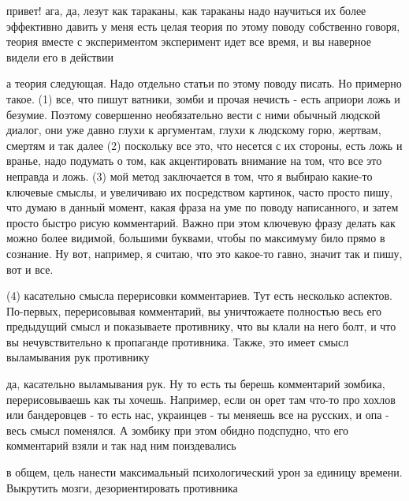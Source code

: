  
 
 
 
 


привет! ага, да, лезут как тараканы, как тараканы
надо научиться их более эффективно давить
у меня есть целая теория по этому поводу
собственно говоря, теория вместе с экспериментом
эксперимент идет все время, и вы наверное видели его в действии

а теория следующая. Надо отдельно статьи по этому поводу писать. Но примерно
такое. (1) все, что пишут ватники, зомби и прочая нечисть - есть априори ложь и
безумие. Поэтому совершенно необязательно вести с ними обычный людской диалог,
они уже давно глухи к аргументам, глухи к людскому горю, жертвам, смертям и так
далее (2) поскольку все это, что несется с их стороны, есть ложь и вранье, надо
подумать о том, как акцентировать внимание на том, что все это неправда и ложь.
(3) мой метод заключается в том, что я выбираю какие-то ключевые смыслы, и
увеличиваю их посредством картинок, часто просто пишу, что думаю в данный
момент, какая фраза на уме по поводу написанного, и затем просто быстро рисую
комментарий. Важно при этом ключевую фразу делать как можно более видимой,
большими буквами, чтобы по максимуму било прямо в сознание. Ну вот, например, я
считаю, что это какое-то гавно, значит так и пишу, вот и все.

(4) касательно смысла перерисовки комментариев. Тут есть несколько аспектов.
По-первых, перерисовывая комментарий, вы уничтожаете полностью весь его
предыдущий смысл и показываете противнику, что вы клали на него болт, и что вы
нечувствительно к пропаганде противника. Также, это имеет смысл выламывания рук
противнику

да, касательно выламывания рук. Ну то есть ты берешь комментарий зомбика,
перерисовываешь как ты хочешь. Например, если он орет там что-то про хохлов или
бандеровцев - то есть нас, украинцев - ты меняешь все на русских, и опа - весь
смысл поменялся. А зомбику при этом обидно подспудно, что его комментарий взяли
и так над ним поиздевались

в общем, цель нанести максимальный психологический урон за единицу времени.
Выкрутить мозги, дезориентировать противника

